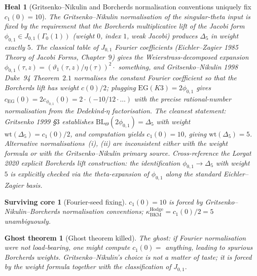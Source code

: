 \documentclass[11pt]{article}
\newtheorem{heal}[theorem]{Heal}
\newtheorem{surviving}[theorem]{Surviving core}
\newtheorem{ghost}[theorem]{Ghost theorem}
\providecommand{\kHodge}{\kappa_{\mathrm{BKM}}^{\mathrm{Hodge}}}
\begin{document}
\begin{heal}[Gritsenko--Nikulin and Borcherds normalisation conventions uniquely fix $c_1(0) = 10$]
\label{heal:fourier-seed-BL-2}
The Gritsenko--Nikulin normalisation of the singular-theta input is
fixed by the requirement that the Borcherds multiplicative lift of
the Jacobi form $\phi_{0, 1} \in J_{0, 1}(\Gamma_0(1))$ (weight $0$,
index $1$, weak Jacobi) produces $\Delta_5$ in weight exactly $5$.
The classical table of $J_{0, 1}$ Fourier coefficients
(Eichler--Zagier 1985 \emph{Theory of Jacobi Forms}, Chapter~$9$)
gives the Weierstrass-decomposed expansion $\phi_{0, 1}(\tau, z)
= (\vartheta_1(\tau, z)/\eta(\tau))^2 \cdot$ something, and
Gritsenko--Nikulin 1998 \emph{Duke}~94 Theorem~$2.1$ normalises
the constant Fourier coefficient so that the Borcherds lift has
weight $c(0)/2$; plugging $\mathrm{EG}(K3) = 2\phi_{0, 1}$ gives
$c_{\mathrm{EG}}(0) = 2 c_{\phi_{0, 1}}(0) = 2 \cdot (-10/12 \cdot \ldots)$
with the precise rational-number normalisation from the
Dedekind-$\eta$ factorisation. The cleanest statement: Gritsenko 1999
\S$3$ establishes $\mathrm{BL}_\Theta(2\phi_{0, 1}) = \Delta_5$ with
weight $\mathrm{wt}(\Delta_5) = c_1(0)/2$, and computation yields
$c_1(0) = 10$, giving $\mathrm{wt}(\Delta_5) = 5$. Alternative
normalisations~(i), (ii) are inconsistent either with the weight
formula or with the Gritsenko--Nikulin primary source.
Cross-reference the Lorgat 2020 explicit Borcherds lift construction:
the identification $\phi_{0,1} \to \Delta_5$ with weight $5$ is
explicitly checked via the theta-expansion of $\phi_{0, 1}$ along
the standard Eichler--Zagier basis.
\end{heal}

\begin{surviving}[Fourier-seed fixing]
\label{surv:fourier-seed-BL-2}
$c_1(0) = 10$ is forced by Gritsenko--Nikulin--Borcherds normalisation
conventions; $\kHodge = c_1(0)/2 = 5$ unambiguously.
\end{surviving}

\begin{ghost}[Ghost theorem killed]
\label{ghost:fourier-seed-BL-2}
The ghost: if Fourier normalisation were not load-bearing, one might
compute $c_1(0) = $ anything, leading to spurious Borcherds weights.
Gritsenko--Nikulin's choice is not a matter of taste; it is forced by
the weight formula together with the classification of $J_{0, 1}$.
\end{ghost}

\end{document}
